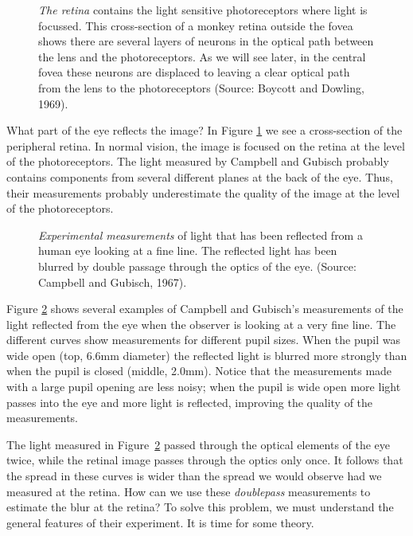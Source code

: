 \begin{figure}
\centerline{
}
\caption[Retinal Cross Section]{ 
{\em The retina} contains the light sensitive photoreceptors
where light is focussed.
This cross-section of a monkey retina outside the fovea
shows there are several layers of neurons
in the optical path between the lens and the photoreceptors.
As we will see later, in the central fovea
these neurons are displaced to leaving a clear
optical path from the lens to the photoreceptors
(Source: Boycott and Dowling, 1969).
}
\label{f1:retinalCrossSection}
\end{figure}
What part of the eye reflects the image?
In Figure \ref{f1:retinalCrossSection}
we see a cross-section of the peripheral retina.
In normal vision, the image
is focused on the retina
at the level of the photoreceptors.
The light measured by Campbell and Gubisch probably
contains components from several different planes
at the back of the eye.
Thus, their measurements probably underestimate the quality
of the image at the level of the photoreceptors.
\nocite{BoycottDowlingSeeROdieckReference}

\begin{figure}
\centerline {
}
\caption[Campbell and Gubisch Data]{ 
\label{f1:cg.data}
{\em Experimental measurements} of light
that has been reflected from a human eye looking at a fine line.
The reflected light has been blurred by double passage through
the optics of the eye.
(Source: Campbell and Gubisch, 1967).
}
\end{figure}
Figure \ref{f1:cg.data} shows
several examples of Campbell and Gubisch's measurements
of the light reflected from the eye when the observer is
looking at a very fine line.
The different curves show measurements
for different pupil sizes.
When the pupil was wide open (top, 6.6mm diameter) the reflected
light is
blurred more strongly than when the pupil is closed (middle, 2.0mm).
Notice that the measurements made with a large pupil opening
are less noisy;
when the pupil is wide open more light passes into the eye
and more light is reflected, improving the quality of the measurements.

The light measured in Figure~\ref{f1:cg.data} passed through the
optical elements of the eye twice, while
the retinal image passes through the optics only once.
It follows that the spread in these curves is wider than the
spread we would observe had we measured at the retina.
How can we use these {\em doublepass}
measurements to estimate the blur at the retina?
To solve this problem,
we must understand the general features of their experiment.
It is time for some theory.

